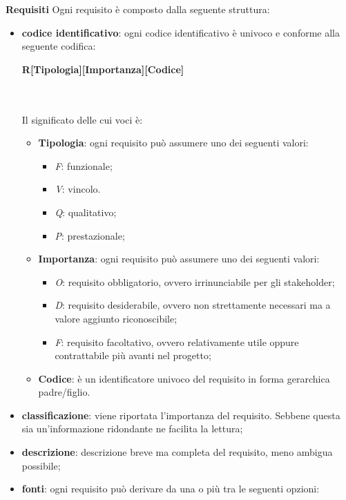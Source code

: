			\noindent
			\textbf{Requisiti} \newline \newline
			Ogni requisito è composto dalla seguente struttura:
			\begin{itemize}
				\item \textbf{codice identificativo}: ogni codice identificativo è univoco e conforme alla seguente codifica: \\
				\centerline{\textbf{R[Tipologia][Importanza][Codice]}} \\ \\
				Il significato delle cui voci è:
				\begin{itemize}					
					\item \textbf{Tipologia}: ogni requisito può assumere uno dei seguenti valori:
					\begin{itemize}
						\item \textit{F}: funzionale;
						\item \textit{V}: vincolo.
						\item \textit{Q}: qualitativo;
						\item \textit{P}: prestazionale;		
					\end{itemize}
				\item \textbf{Importanza}: ogni requisito può assumere uno dei seguenti valori:
				\begin{itemize}
					\item \textit{O}: requisito obbligatorio, ovvero irrinunciabile per gli stakeholder\glo;
					\item \textit{D}: requisito desiderabile, ovvero non strettamente necessari ma a valore aggiunto riconoscibile;
					\item \textit{F}: requisito facoltativo, ovvero relativamente utile oppure contrattabile più avanti nel progetto;	
				\end{itemize}
					\item \textbf{Codice}: è un identificatore univoco del requisito in forma gerarchica padre/figlio.
				\end{itemize}
				\item \textbf{classificazione}: viene riportata l'importanza del requisito. Sebbene questa sia un'informazione ridondante ne facilita la lettura;
				\item \textbf{descrizione}: descrizione breve ma completa del requisito, meno ambigua possibile;
				\item \textbf{fonti}: ogni requisito può derivare da una o più tra le seguenti opzioni:

\end{itemize}

